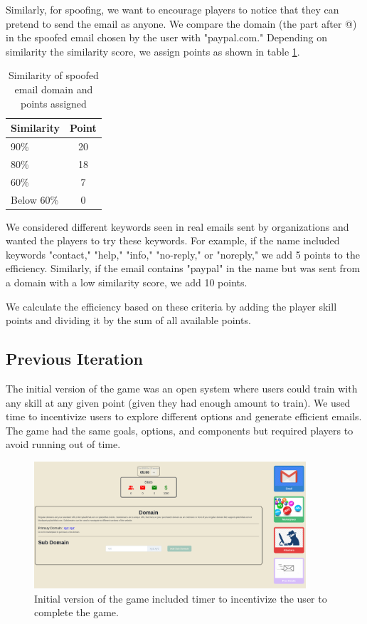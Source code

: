 Similarly, for spoofing, we want to encourage players to notice that they can pretend to send the email as anyone. We compare the domain (the part after @) in the spoofed email chosen by the user with "paypal.com." Depending on similarity the similarity score, we assign points as shown in table \ref{tab:similarity_spoofed}.

\begin{table}[!ht]
    \centering
    \begin{tabular}{l c}
        \hline
        Similarity & Point \\
        \hline
        90\%       & 20    \\
        80\%       & 18    \\
        60\%       & 7     \\
        Below 60\% & 0     \\
        \hline
    \end{tabular}%
    \caption{Similarity of spoofed email domain and points assigned}
    \label{tab:similarity_spoofed}
\end{table}

We considered different keywords seen in real emails sent by organizations and wanted the players to try these keywords. For example, if the name included keywords "contact," "help," "info," "no-reply," or "noreply," we add 5 points to the efficiency. Similarly, if the email contains "paypal" in the name but was sent from a domain with a low similarity score, we add 10 points.

We calculate the efficiency based on these criteria by adding the player skill points and dividing it by the sum of all available points.

\subsection{Previous Iteration}
The initial version of the game was an open system where users could train with any skill at any given point (given they had enough amount to train). We used time to incentivize users to explore different options and generate efficient emails. The game had the same goals, options, and components but required players to avoid running out of time.

\begin{figure}[!ht]
    \centering
    \includegraphics[width=0.9\textwidth]{figures/section2/game_initial.png}
    \caption[Initial version of the game]{Initial version of the game included timer to incentivize the user to complete the game.}
\end{figure}


